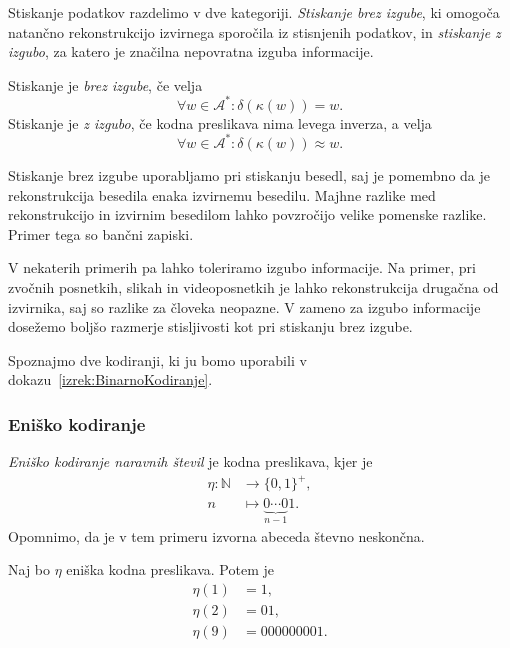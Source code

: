 \documentclass[fin1, tisk]{fmfdelo}
\newcommand{\N}{\mathbb{N}}
\newcommand{\A}{\mathcal{A}}
\theoremstyle{definition}
\begin{document}
Stiskanje podatkov razdelimo v dve kategoriji. \emph{Stiskanje brez izgube}, ki omogoča natančno
rekonstrukcijo izvirnega sporočila iz stisnjenih podatkov, in \emph{stiskanje z izgubo}, za katero
je značilna nepovratna izguba informacije.

\begin{definicija}
    Stiskanje je \emph{brez izgube}, če velja
    \[
        \forall w \in \A^* \colon \delta(\kappa(w)) = w.
    \]
    Stiskanje je \emph{z izgubo}, če kodna preslikava nima levega inverza,
    a velja
    \[
        \forall w \in \A^* \colon \delta(\kappa(w)) \approx w.
    \]
\end{definicija}

Stiskanje brez izgube uporabljamo pri stiskanju besedl, saj je pomembno da je rekonstrukcija
besedila enaka izvirnemu besedilu. Majhne razlike med rekonstrukcijo in izvirnim besedilom 
lahko povzročijo velike pomenske razlike. Primer tega so bančni zapiski.

V nekaterih primerih pa lahko toleriramo izgubo informacije. Na primer, pri zvočnih posnetkih, 
slikah in videoposnetkih je lahko rekonstrukcija drugačna od izvirnika, saj so razlike za 
človeka neopazne. V zameno za izgubo informacije dosežemo boljšo razmerje stisljivosti kot
pri stiskanju brez izgube.

Spoznajmo dve kodiranji, ki ju bomo uporabili v dokazu~\ref{izrek:BinarnoKodiranje}.

\subsubsection{Eniško kodiranje}

\begin{definicija}\label{def:eniška}%
    \emph{Eniško kodiranje naravnih števil} je kodna preslikava, kjer je 
    \begin{align*}
        \eta \colon \N &\to \{ 0, 1 \}^+, \\
        n &\mapsto \underbrace{0 \cdots 0}_{n-1}1.
    \end{align*}
    Opomnimo, da je v tem primeru izvorna abeceda števno neskončna.
\end{definicija}

\begin{primer}
    Naj bo $\eta$ eniška kodna preslikava. Potem je
    \begin{align*}
        \eta(1) &= 1, \\
        \eta(2) &= 01, \\ 
        \eta(9) &= 000000001.
    \end{align*}
\end{primer}
\end{document}
